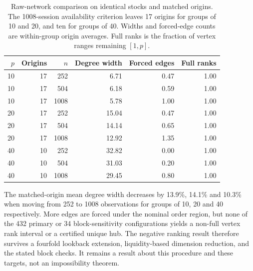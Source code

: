 \begin{table}[htbp]
\caption{Raw-network comparison on identical stocks and matched origins. The 1008-session availability criterion leaves 17 origins for groups of 10 and 20, and ten for groups of 40. Widths and forced-edge counts are within-group origin averages. Full ranks is the fraction of vertex ranges remaining $[1,p]$.}\label{tab:extended}
\centering\small
\begin{tabular}{rrrrrr}
\toprule
$p$ & Origins & $n$ & Degree width & Forced edges & Full ranks \\
\midrule
10 & 17 & 252 & 6.71 & 0.47 & 1.00 \\
10 & 17 & 504 & 6.18 & 0.59 & 1.00 \\
10 & 17 & 1008 & 5.78 & 1.00 & 1.00 \\
20 & 17 & 252 & 15.04 & 0.47 & 1.00 \\
20 & 17 & 504 & 14.14 & 0.65 & 1.00 \\
20 & 17 & 1008 & 12.92 & 1.35 & 1.00 \\
40 & 10 & 252 & 32.82 & 0.00 & 1.00 \\
40 & 10 & 504 & 31.03 & 0.20 & 1.00 \\
40 & 10 & 1008 & 29.45 & 0.80 & 1.00 \\
\bottomrule
\end{tabular}
\end{table}
The matched-origin mean degree width decreases by 13.9\%, 14.1\% and 10.3\% when moving from 252 to 1008 observations for groups of 10, 20 and 40 respectively. More edges are forced under the nominal order region, but none of the 432 primary or 34 block-sensitivity configurations yields a non-full vertex rank interval or a certified unique hub. The negative ranking result therefore survives a fourfold lookback extension, liquidity-based dimension reduction, and the stated block checks. It remains a result about this procedure and these targets, not an impossibility theorem.

